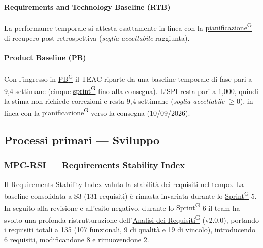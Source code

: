\documentclass[a4paper,12pt]{article}
\providecommand{\glslink}[2]{\href{https://alittlebyte-19.github.io/Documentazione/glossario.html\#gls-#1}{\underline{#2}\textsuperscript{\scriptsize G}}}
\begin{document}
\paragraph*{Requirements and Technology Baseline (RTB)} La performance temporale si attesta esattamente in linea con la \glslink{pianificazione}{pianificazione} di recupero post-retrospettiva (\emph{soglia accettabile} raggiunta).

\paragraph*{Product Baseline (PB)} Con l'ingresso in \glslink{pb-product-baseline}{PB} il TEAC riparte da una baseline temporale di fase pari a 9,4 settimane (cinque \glslink{sprint}{sprint} fino alla consegna). L'SPI resta pari a 1,000, quindi la stima non richiede correzioni e resta 9,4 settimane (\emph{soglia accettabile} $\geq 0$), in linea con la \glslink{pianificazione}{pianificazione} verso la consegna (10/09/2026).

\subsection{Processi primari — Sviluppo}

\subsubsection{MPC-RSI — Requirements Stability Index}

Il Requirements Stability Index valuta la stabilità dei requisiti nel tempo. La baseline consolidata a S3 (131 requisiti) è rimasta invariata durante lo \glslink{sprint}{Sprint} 5. In seguito alla revisione e all'esito negativo, durante lo \glslink{sprint}{Sprint} 6 il team ha svolto una profonda ristrutturazione dell'\glslink{analisi-dei-requisiti-adr}{Analisi dei Requisiti} (v2.0.0), portando i requisiti totali a 135 (107 funzionali, 9 di qualità e 19 di vincolo), introducendo 6 requisiti, modificandone 8 e rimuovendone 2.
\end{document}
